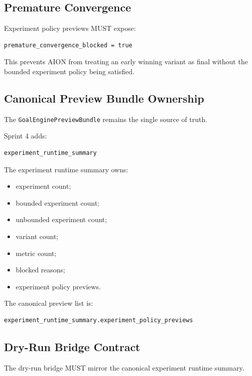\subsection{Premature Convergence}

Experiment policy previews MUST expose:

\begin{verbatim}
premature_convergence_blocked = true
\end{verbatim}

This prevents AION from treating an early winning variant as final without the bounded experiment policy being satisfied.

\subsection{Canonical Preview Bundle Ownership}

The \texttt{GoalEnginePreviewBundle} remains the single source of truth.

Sprint 4 adds:

\begin{verbatim}
experiment_runtime_summary
\end{verbatim}

The experiment runtime summary owns:

\begin{itemize}
  \item experiment count;
  \item bounded experiment count;
  \item unbounded experiment count;
  \item variant count;
  \item metric count;
  \item blocked reasons;
  \item experiment policy previews.
\end{itemize}

The canonical preview list is:

\begin{verbatim}
experiment_runtime_summary.experiment_policy_previews
\end{verbatim}

\subsection{Dry-Run Bridge Contract}

The dry-run bridge MUST mirror the canonical experiment runtime summary.

